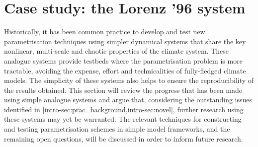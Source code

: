 \documentclass[../main.tex]{subfiles}
\begin{document}
\ifSubfilesClassLoaded{
    \frontmatter
    \tableofcontents
    \mainmatter
}{}

\chapter{Case study: the Lorenz '96 system} \label{chap:lorenz96}
\setlength{\epigraphwidth}{.45\textwidth}

Historically, it has been common practice to develop and test new
parametrisation techniques using simpler dynamical systems that share the key
nonlinear, multi-scale and chaotic properties of the climate system. These
analogue systems provide testbeds where the parametrisation problem is more
tractable, avoiding the expense, effort and technicalities of fully-fledged
climate models. The simplicity of these systems also helps to ensure the
reproducibility of the results obtained. This section will review the progress
that has been made using simple analogue systems and argue that, considering
the outstanding issues identified in
\cref{intro-sec:prac_background,intro-sec:novel}, further research using these
systems may yet be warranted. The relevant techniques for constructing and
testing parametrisation schemes in simple model frameworks, and the remaining
open questions, will be discussed in order to inform future research.

\end{document}
